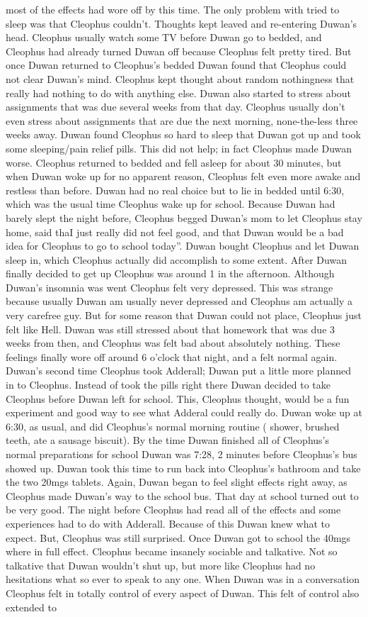 \documentclass[12pt]{book}
\begin{document}
most of the effects had wore off by this time. The only problem with tried to sleep was that Cleophus couldn't. Thoughts kept leaved and re-entering Duwan's head. Cleophus usually watch some TV before Duwan go to bedded, and Cleophus had already turned Duwan off because Cleophus felt pretty tired. But once Duwan returned to Cleophus's bedded Duwan found that Cleophus could not clear Duwan's mind. Cleophus kept thought about random nothingness that really had nothing to do with anything else. Duwan also started to stress about assignments that was due several weeks from that day. Cleophus usually don't even stress about assignments that are due the next morning, none-the-less three weeks away. Duwan found Cleophus so hard to sleep that Duwan got up and took some sleeping/pain relief pills. This did not help; in fact Cleophus made Duwan worse. Cleophus returned to bedded and fell asleep for about 30 minutes, but when Duwan woke up for no apparent reason, Cleophus felt even more awake and restless than before. Duwan had no real choice but to lie in bedded until 6:30, which was the usual time Cleophus wake up for school. Because Duwan had barely slept the night before, Cleophus begged Duwan's mom to let Cleophus stay home, said thaI just really did not feel good, and that Duwan would be a bad idea for Cleophus to go to school today''. Duwan bought Cleophus and let Duwan sleep in, which Cleophus actually did accomplish to some extent. After Duwan finally decided to get up Cleophus was around 1 in the afternoon. Although Duwan's insomnia was went Cleophus felt very depressed. This was strange because usually Duwan am usually never depressed and Cleophus am actually a very carefree guy. But for some reason that Duwan could not place, Cleophus just felt like Hell. Duwan was still stressed about that homework that was due 3 weeks from then, and Cleophus was felt bad about absolutely nothing. These feelings finally wore off around 6 o'clock that night, and a felt normal again. Duwan's second time Cleophus took Adderall; Duwan put a little more planned in to Cleophus. Instead of took the pills right there Duwan decided to take Cleophus before Duwan left for school. This, Cleophus thought, would be a fun experiment and good way to see what Adderal could really do. Duwan woke up at 6:30, as usual, and did Cleophus's normal morning routine ( shower, brushed teeth, ate a sausage biscuit). By the time Duwan finished all of Cleophus's normal preparations for school Duwan was 7:28, 2 minutes before Cleophus's bus showed up. Duwan took this time to run back into Cleophus's bathroom and take the two 20mgs tablets. Again, Duwan began to feel slight effects right away, as Cleophus made Duwan's way to the school bus. That day at school turned out to be very good. The night before Cleophus had read all of the effects and some experiences had to do with Adderall. Because of this Duwan knew what to expect. But, Cleophus was still surprised. Once Duwan got to school the 40mgs where in full effect. Cleophus became insanely sociable and talkative. Not so talkative that Duwan wouldn't shut up, but more like Cleophus had no hesitations what so ever to speak to any one. When Duwan was in a conversation Cleophus felt in totally control of every aspect of Duwan. This felt of control also extended to 
\end{document}
